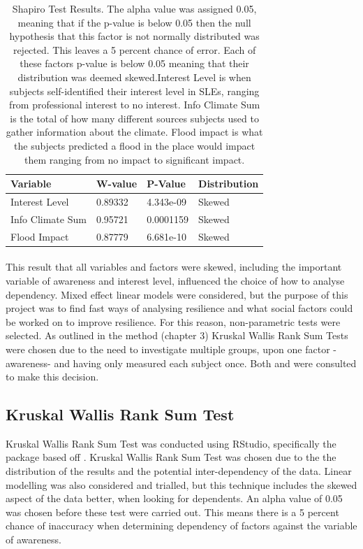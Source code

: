\begin{table}[H]
    \centering
    \begin{tabular}{|l|l|l|l|}
    \hline
         \textbf{ Variable } &  \textbf{W-value}& \textbf{ P-Value}& \textbf{Distribution}\\ \hline
       Interest Level & 0.89332 & 4.343e-09 & Skewed \\ \hline
         Info Climate Sum  & 0.95721 & 0.0001159 & Skewed \\ \hline
        Flood Impact & 0.87779 & 6.681e-10 & Skewed \\ \hline
     \end{tabular}
    \caption{Shapiro Test Results. The alpha value was assigned 0.05, meaning that if the p-value is below 0.05 then the null hypothesis that this factor is not normally distributed was rejected. This leaves a 5 percent chance of error. Each of these factors p-value is below 0.05 meaning that their distribution was deemed skewed.Interest Level is when subjects self-identified their interest level in SLEs, ranging from professional interest to no interest. Info Climate Sum is the total of how many different sources subjects used to gather information about the climate. Flood impact is what the subjects predicted a flood in the place would impact them ranging from no impact to significant impact. }
    \label{table:shapiro_test_results}
\end{table}
\paragraph{}

This result that all variables and factors were skewed, including the important variable of awareness and interest level, influenced the choice of how to analyse dependency. Mixed effect linear models were considered, but the purpose of this project was to find fast ways of analysing resilience and what social factors could be worked on to improve resilience. For this reason, non-parametric tests were selected. As outlined in the method (chapter 3) Kruskal Wallis Rank Sum Tests were chosen due to the need to investigate multiple groups, upon one factor -awareness- and having only measured each subject once. Both \cite{tasman_how_2014} and \cite{hollander_nonparametric_2014} were consulted to make this decision. 

\subsection{Kruskal Wallis Rank Sum Test}
Kruskal Wallis Rank Sum Test was conducted using RStudio, specifically the package based off \cite{hollander_nonparametric_2014}. Kruskal Wallis Rank Sum Test was chosen due to the the distribution of the results and the potential inter-dependency of the data. Linear modelling was also considered and trialled, but this technique includes the skewed aspect of the data better, when looking for dependents. An alpha value of 0.05 was chosen before these test were carried out. This means there is a 5 percent chance of inaccuracy when determining dependency of factors against the variable of awareness.

